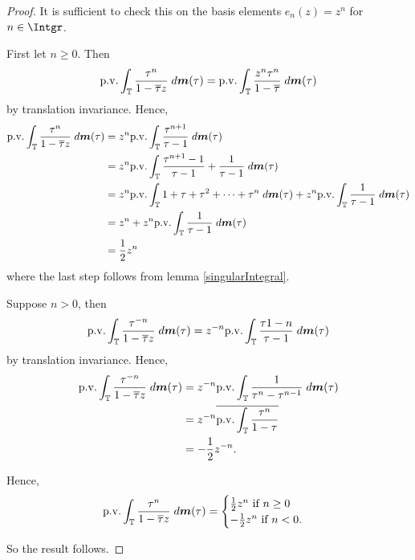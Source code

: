 \documentclass{unswmaths}
\begin{document}
\begin{proof}
    It is sufficient to check this on the basis elements $e_n(z) = z^n$ for $n \in \Intgr$.
    
    First let $n \geq 0$. Then
    \begin{equation*}
        \mathrm{p.v.}\int_{\mathbb{T}} \frac{\tau^n}{1-\overline{\tau}z}\;d\boldsymbol{m}(\tau) = \mathrm{p.v.}\int_{\mathbb{T}} \frac{z^n\tau^n}{1-\overline{\tau}}\;d\boldsymbol{m}(\tau)
    \end{equation*}
    by translation invariance.
    Hence,
    \begin{align*}
        \mathrm{p.v.}\int_{\mathbb{T}} \frac{\tau^n}{1-\overline{\tau}z}\;d\boldsymbol{m}(\tau) &= z^n\mathrm{p.v.}\int_{\mathbb{T}} \frac{\tau^{n+1}}{\tau-1}\;d\boldsymbol{m}(\tau) \\
        &= z^n \mathrm{p.v.}\int_{\mathbb{T}} \frac{\tau^{n+1}-1}{\tau-1}+\frac{1}{\tau-1}\;d\boldsymbol{m}(\tau)\\
        &= z^n \mathrm{p.v.}\int_{\mathbb{T}} 1+\tau+\tau^2+\cdots+\tau^{n}\;d\boldsymbol{m}(\tau)+z^n\mathrm{p.v.}\int_{\mathbb{T}} \frac{1}{\tau-1}\;d\boldsymbol{m}(\tau)\\
        &= z^n + z^n\mathrm{p.v.}\int_{\mathbb{T}} \frac{1}{\tau-1}\;d\boldsymbol{m}(\tau)\\
        &= \frac{1}{2}z^n
    \end{align*}
    where the last step follows from lemma \ref{singularIntegral}.
    
    Suppose $n > 0$, then
    \begin{equation*}
        \mathrm{p.v.}\int_{\mathbb{T}} \frac{\tau^{-n}}{1-\overline{\tau}z}\;d\boldsymbol{m}(\tau) = z^{-n} \mathrm{p.v.}\int_{\mathbb{T}} \frac{\tau{1-n}}{\tau-1}\;d\boldsymbol{m}(\tau)
    \end{equation*}
    by translation invariance. Hence,
    \begin{align*}
        \mathrm{p.v.}\int_{\mathbb{T}} \frac{\tau^{-n}}{1-\overline{\tau}z}\;d\boldsymbol{m}(\tau) &= z^{-n} \mathrm{p.v.} \int_{\mathbb{T}} \frac{1}{\tau^n-\tau^{n-1}}\;d\boldsymbol{m}(\tau)\\
        &= z^{-n}\overline{\mathrm{p.v.}\int_{\mathbb{T}} \frac{\tau^n}{1-\tau}}\\
        &= -\frac{1}{2}z^{-n}.
    \end{align*}
    
    Hence, 
    \begin{equation*}
        \mathrm{p.v.}\int_{\mathbb{T}} \frac{\tau^n}{1-\overline{\tau}z}\;d\boldsymbol{m}(\tau) = \begin{cases}
            \frac{1}{2}z^n\text{ if }n \geq 0\\
            -\frac{1}{2}z^n\text{ if }n < 0.
        \end{cases}
    \end{equation*}
    
    So the result follows.
    
\end{proof}
\end{document}
